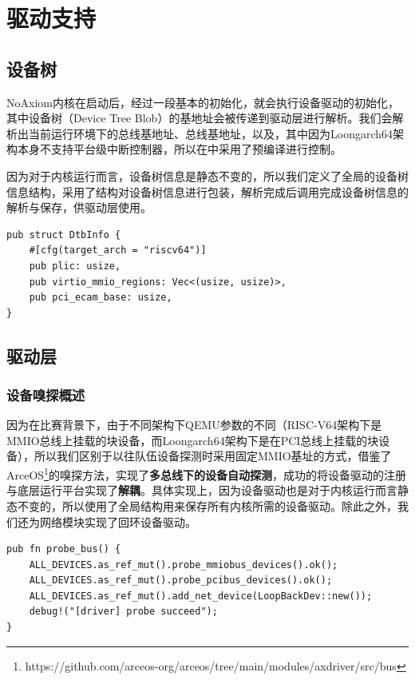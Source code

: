 \documentclass{article}
\begin{document}
\newpage
\section{驱动支持}
\subsection{设备树}
NoAxiom内核在启动后，经过一段基本的初始化，就会执行设备驱动的初始化，其中设备树（Device Tree Blob）的基地址会被传递到驱动层进行解析。我们会解析出当前运行环境下的总线基地址、总线基地址，以及，其中因为Loongarch64架构本身不支持平台级中断控制器，所以在中采用了预编译进行控制。

因为对于内核运行而言，设备树信息是静态不变的，所以我们定义了全局的设备树信息结构，采用了结构对设备树信息进行包装，解析完成后调用完成设备树信息的解析与保存，供驱动层使用。

\begin{lstlisting}
pub struct DtbInfo {
    #[cfg(target_arch = "riscv64")]
    pub plic: usize,
    pub virtio_mmio_regions: Vec<(usize, usize)>,
    pub pci_ecam_base: usize,
}
\end{lstlisting}

\subsection{驱动层}
\subsubsection{设备嗅探概述}
因为在比赛背景下，由于不同架构下QEMU参数的不同（RISC-V64架构下是MMIO总线上挂载的块设备，而Loongarch64架构下是在PCI总线上挂载的块设备），所以我们区别于以往队伍设备探测时采用固定MMIO基址的方式，借鉴了ArceOS\footnote{https://github.com/arceos-org/arceos/tree/main/modules/axdriver/src/bus}的嗅探方法，实现了\textbf{多总线下的设备自动探测}，成功的将设备驱动的注册与底层运行平台实现了\textbf{解耦}。具体实现上，因为设备驱动也是对于内核运行而言静态不变的，所以使用了全局结构用来保存所有内核所需的设备驱动。除此之外，我们还为网络模块实现了回环设备驱动。

\begin{lstlisting}
pub fn probe_bus() {
    ALL_DEVICES.as_ref_mut().probe_mmiobus_devices().ok();
    ALL_DEVICES.as_ref_mut().probe_pcibus_devices().ok();
    ALL_DEVICES.as_ref_mut().add_net_device(LoopBackDev::new());
    debug!("[driver] probe succeed");
}
\end{lstlisting}
\end{document}
